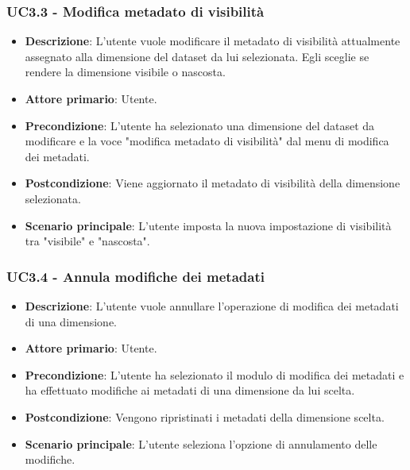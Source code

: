 \subsubsection{UC3.3 - Modifica metadato di visibilità}
\label{subsubsec:uc3.2}

\begin{itemize}
    \item \textbf{Descrizione}: L’utente vuole modificare il metadato di visibilità attualmente 
                                assegnato alla dimensione del dataset da lui selezionata.
                                Egli sceglie se rendere la dimensione visibile o nascosta.
	
    \item \textbf{Attore primario}: Utente.
    
    \item \textbf{Precondizione}:   L'utente ha selezionato una dimensione del dataset da modificare
                                    e la voce "modifica metadato di visibilità" dal menu di modifica dei metadati.

    \item \textbf{Postcondizione}:  Viene aggiornato il metadato di visibilità della dimensione selezionata.

	\item \textbf{Scenario principale}: L'utente imposta la nuova impostazione di visibilità tra "visibile" e "nascosta".
\end{itemize}


\subsubsection{UC3.4 - Annula modifiche dei metadati}
\label{subsubsec:uc3.4}

\begin{itemize}
    \item \textbf{Descrizione}: L’utente vuole annullare l'operazione di modifica dei metadati di una dimensione.
    \item \textbf{Attore primario}: Utente.
    
    \item \textbf{Precondizione}:   L'utente ha selezionato il modulo di modifica dei metadati e ha effettuato 
                                    modifiche ai metadati di una dimensione da lui scelta.
    \item \textbf{Postcondizione}:  Vengono ripristinati i metadati della dimensione scelta.

	\item \textbf{Scenario principale}: L'utente seleziona l'opzione di annulamento delle modifiche.
\end{itemize}


